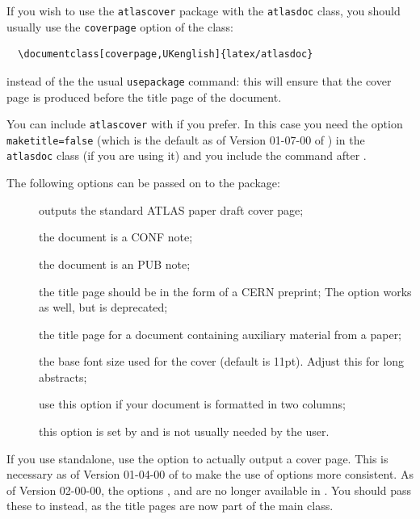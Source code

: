 If you wish to use the \texttt{atlascover} package with the 
\texttt{atlasdoc} class, you should usually use the \texttt{coverpage} option of the class:
\begin{verbatim}
  \documentclass[coverpage,UKenglish]{latex/atlasdoc}
\end{verbatim}
instead of the the usual \texttt{usepackage} command: this will ensure
that the cover page is produced before the title page of the document.

You can include \texttt{atlascover} with  if you prefer.
In this case you need the option \texttt{maketitle=false}
(which is the default as of Version 01-07-00 of ) in the \texttt{atlasdoc} class
(if you are using it)
and you include the  command after \verb||.

The following options can be passed on to the  package:
\begin{description}
\item[] outputs the standard ATLAS paper draft cover page;
\item[] the document is a CONF note;
\item[] the document is an PUB note;
\item[] the title page should be in the form of a CERN preprint;
  The option  works as well, but is deprecated;
\item[] the title page for a document containing auxiliary material from a paper;
\item[] the base font size used for the cover (default is 11pt). Adjust this for long abstracts;
\item[] use this option if your document is formatted in two columns;
\item[] this option is set by  and is not usually needed by the user.
\end{description}

If you use  standalone, use the option  to
actually output a cover page. 
This is necessary as of Version 01-04-00 of  to make the use of options more consistent.
As of Version 02-00-00, the options ,  and  are no longer available
in .
You should pass these to  instead, as the title pages are now part of the main class.


